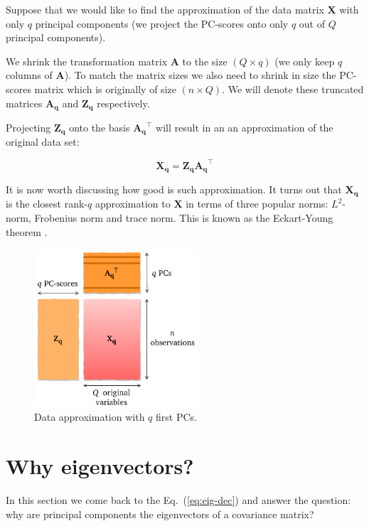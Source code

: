 \documentclass[10pt,twocolumn]{article}
\begin{document}
Suppose that we would like to find the approximation of the data matrix $\mathbf{X}$ with only $q$ principal components (we project the PC-scores onto only $q$ out of $Q$ principal components).

We shrink the transformation matrix $\mathbf{A}$ to the size $(Q \times q)$ (we only keep $q$ columns of $\mathbf{A}$). To match the matrix sizes we also need to shrink in size the PC-scores matrix which is originally of size $(n \times Q)$. We will denote these truncated matrices $\mathbf{A_q}$ and $\mathbf{Z_q}$ respectively.



Projecting $\mathbf{Z_q}$ onto the basis $\mathbf{A_q}^{\top}$ will result in an an approximation of the original data set:

\begin{equation} \label{eq:X-approximation}
\mathbf{X_q} = \mathbf{Z_q} \mathbf{A_q}^{\top}
\end{equation}

It is now worth discussing how good is such approximation. It turns out that $\mathbf{X_q}$ is the closest rank-$q$ approximation to $\mathbf{X}$ in terms of three popular norms: $L^2$-norm, Frobenius norm and trace norm. This is known as the Eckart-Young theorem \cite{eckart-young}.

\begin{figure}[H]
\centering\includegraphics[width=6.1cm]{data-approx.pdf}
\caption{Data approximation with $q$ first PCs.}
\label{fig:data-approx}
\end{figure}

\section{Why eigenvectors?}

In this section we come back to the Eq.~(\ref{eq:eig-dec}) and answer the question: why are principal components the eigenvectors of a covariance matrix? 
\end{document}
